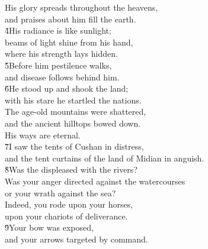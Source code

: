 \begin{poetry}
\poeml His glory spreads throughout the heavens, \\
\poemll    and praises about him fill the earth. \\
\poeml \v{4}His radiance is like sunlight; \\
\poemll    beams of light shine from his hand, \\
\poemlll       where his strength lays hidden. \\
\poeml \v{5}Before him pestilence walks, \\
\poemll    and disease follows behind him. \\
\poeml \v{6}He stood up and shook the land; \\
\poemll    with his stare he startled the nations. \\
\poeml The age-old mountains were shattered, \\
\poemll    and the ancient hilltops bowed down. \\
\poeml His ways are eternal. \\
\poeml \v{7}I saw the tents of Cushan in distress, \\
\poemll    and the tent curtains of the land of Midian in anguish. \\
\poeml \v{8}Was the  displeased with the rivers? \\
\poemll    Was your anger directed against the watercourses \\
\poemlll       or your wrath against the sea? \\
\poeml Indeed, you rode upon your horses, \\
\poemll    upon your chariots of deliverance. \\
\poeml \v{9}Your bow was exposed, \\
\poemll    and your arrows targeted by command.
\end{poetry}

